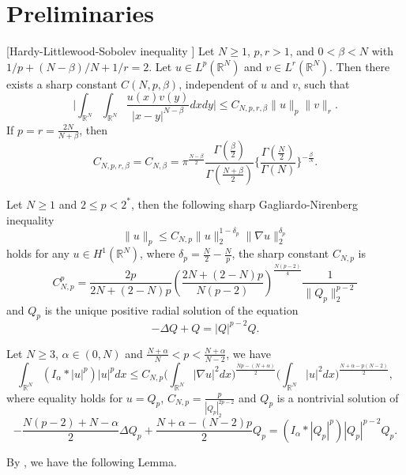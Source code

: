 \documentclass[reqno]{amsart}
\begin{document}
\section{Preliminaries}

\begin{lemma}\label{L22}[Hardy-Littlewood-Sobolev inequality \cite{lieb}]
Let $N\geq1$, $p, r>1$, and $0<\beta<N$ with $1/p+(N-\beta)/N+1/r=2$. 
Let $u\in L^p(\mathbb{R}^N)$ and $v\in L^r(\mathbb{R}^N)$. 
Then there exists a sharp constant $C(N,p,\beta)$, independent of $u$ and $v$, 
such that
\[
\big|\int_{\mathbb{R}^N}\int_{\mathbb{R}^N}\frac{u(x)v(y)}{|x-y|^{N-\beta}}dxdy\big|
\leq C_{N,p,r,\beta}\| u\|_p \| v\| _r.
\]
If $p=r=\frac{2N}{N+\beta}$, then
\[
 C_{N,p,r,\beta}=C_{N,\beta}
 =\pi^{\frac{N-\beta}{2}}
 \frac{\Gamma(\frac{\beta}{2})}{\Gamma(\frac{N+\beta}{2})}
 \Big\{\frac{\Gamma(\frac{N}{2})}{\Gamma(N)}\Big\}^{-\frac{\beta}{N}}.
\]
\end{lemma}

\begin{lemma} \label{Gn75}
 Let $N\geq1$ and $2\leq p<2^*$, then the following sharp Gagliardo-Nirenberg 
inequality
 \begin{equation}\label{GN}
\| u\|_p\leq C_{N,p}\| u\|_2^{1-\delta_p}\| \nabla u\|_2^{\delta_p}
\end{equation}
holds for any $u\in H^1(\mathbb{R}^N)$, where $\delta_p=\frac{N}{2}-\frac{N}{p}$, 
the sharp constant $C_{N,p}$ is
\[
 C_{N,p}^p=\frac{2p}{2N+(2-N)p}(\frac{2N+(2-N)p}{N(p-2)})^{\frac{N(p-2)}{4}}
 \frac{1}{\|Q_p\|_2^{p-2}}
\]
and $Q_p$ is the unique positive radial solution of the equation
\[
 -\Delta Q+Q=|Q|^{p-2}Q.
\]
\end{lemma}

\begin{lemma} \label{123}
Let $N\geq3$, $\alpha\in(0,N)$ and $\frac{N+\alpha}{N}<p<\frac{N+\alpha}{N-2}$, we have
\begin{equation}\label{GN2}
 \int_{\mathbb{R}^N}(I_\alpha\ast|u|^p)|u|^pdx
 \leq C_{N,p}\Big(\int_{\mathbb{R}^N}|\nabla u|
 ^2dx\Big)^{\frac{Np-(N+\alpha)}{2}}
 \Big(\int_{\mathbb{R}^N}|u|^2dx\Big)^{\frac{N+\alpha-p(N-2)}{2}},
\end{equation}
where equality holds for $u=Q_p$, $C_{N,p}=\frac{p}{|Q_p|_2^{2p-2}}$ and $Q_p$ 
is a nontrivial solution of
\begin{equation}
 -\frac{N(p-2)+N-\alpha}{2}\Delta Q_p+\frac{N+\alpha-(N-2)p}{2}Q_p
 =(I_\alpha\ast|Q_p|^p)|Q_p|^{p-2}Q_p.
\end{equation}
\end{lemma}
By \cite[(3.3)]{banqun}, we have the following Lemma.
\end{document}
